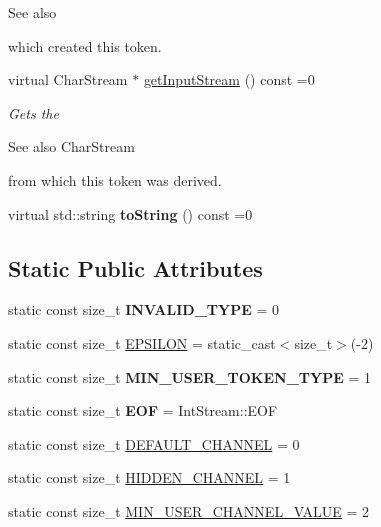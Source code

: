 \begin{DoxyCompactItemize}
\begin{DoxyCompactList}
\begin{DoxySeeAlso}{See also}
\end{DoxySeeAlso}
which created this token. \end{DoxyCompactList}\item 
\mbox{\label{classantlr4_1_1Token_a777d6dac8e4a0b9552b4860685ebc128}} 
virtual Char\+Stream $\ast$ \hyperlink{classantlr4_1_1Token_a777d6dac8e4a0b9552b4860685ebc128}{get\+Input\+Stream} () const =0
\begin{DoxyCompactList}\small\item\em Gets the \begin{DoxySeeAlso}{See also}
Char\+Stream


\end{DoxySeeAlso}
from which this token was derived. \end{DoxyCompactList}\item 
\mbox{\label{classantlr4_1_1Token_ae64217a9da4bffccfd1a2defe6342fc9}} 
virtual std\+::string {\bfseries to\+String} () const =0
\end{DoxyCompactItemize}
\subsection*{Static Public Attributes}
\begin{DoxyCompactItemize}
\item 
\mbox{\label{classantlr4_1_1Token_ac6f393335525c0043de239f837a40da0}} 
static const size\+\_\+t {\bfseries I\+N\+V\+A\+L\+I\+D\+\_\+\+T\+Y\+PE} = 0
\item 
static const size\+\_\+t \hyperlink{classantlr4_1_1Token_aed7bace05b57d7e1cc1dac0c79390b0a}{E\+P\+S\+I\+L\+ON} = static\+\_\+cast$<$size\+\_\+t$>$(-\/2)
\item 
\mbox{\label{classantlr4_1_1Token_aad3beb5fa508bbbe7ef57c951a8bc80e}} 
static const size\+\_\+t {\bfseries M\+I\+N\+\_\+\+U\+S\+E\+R\+\_\+\+T\+O\+K\+E\+N\+\_\+\+T\+Y\+PE} = 1
\item 
\mbox{\label{classantlr4_1_1Token_aa713e5cd240face9ea9e6345fe775022}} 
static const size\+\_\+t {\bfseries E\+OF} = Int\+Stream\+::\+E\+OF
\item 
static const size\+\_\+t \hyperlink{classantlr4_1_1Token_a699cbc56affbddc079561e175cba8435}{D\+E\+F\+A\+U\+L\+T\+\_\+\+C\+H\+A\+N\+N\+EL} = 0
\item 
static const size\+\_\+t \hyperlink{classantlr4_1_1Token_af9bee187eba93f908d76d6406883424a}{H\+I\+D\+D\+E\+N\+\_\+\+C\+H\+A\+N\+N\+EL} = 1
\item 
static const size\+\_\+t \hyperlink{classantlr4_1_1Token_aa43b01289ec2d195ced55255a37ad314}{M\+I\+N\+\_\+\+U\+S\+E\+R\+\_\+\+C\+H\+A\+N\+N\+E\+L\+\_\+\+V\+A\+L\+UE} = 2
\end{DoxyCompactItemize}


